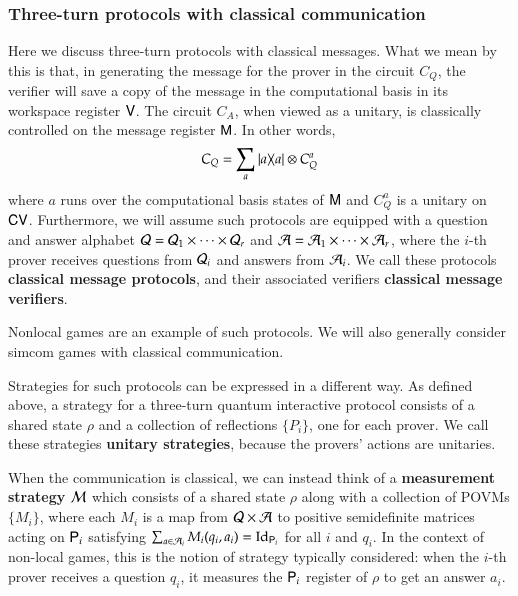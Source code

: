 \subsubsection{Three-turn protocols with classical communication}


Here we discuss three-turn protocols with classical messages. What we mean by this is that, in generating the message for the prover in the circuit $C_Q$, the verifier will save a copy of the message in the computational basis in its workspace register ${\mathsf{V}}$. The circuit $C_A$, when viewed as a unitary, is classically controlled on the message register ${\mathsf{M}}$. In other words, 
\[
	C_Q = \sum_{a} |a\rangle\! \langle a| \otimes C_Q^a 
\]
where $a$ runs over the computational basis states of ${\mathsf{M}}$ and $C_Q^a$ is a unitary on ${\mathsf{C}} {\mathsf{V}}$. Furthermore, we will assume such protocols are equipped with a question and answer alphabet $\mathcal Q = \mathcal Q_1 \times \cdots \times \mathcal Q_r$ and $\mathcal A = \mathcal A_1 \times \cdots \times \mathcal A_r$, where the $i$-th prover receives questions from $\mathcal Q_i$ and answers from $\mathcal A_i$. We call these protocols \textbf{classical message protocols}, and their associated verifiers \textbf{classical message verifiers}.

Nonlocal games are an example of such protocols. We will also generally consider simcom games with classical communication. 

Strategies for such protocols can be expressed in a different way. As defined above, a strategy for a three-turn quantum interactive protocol consists of a shared state $\rho$ and a collection of reflections $\{ P_i \}$, one for each prover. We call these strategies \textbf{unitary strategies}, because the provers' actions are unitaries.

When the communication is classical, we can instead think of a \textbf{measurement strategy} $\mathcal M$ which consists of a shared state $\rho$ along with a collection of POVMs $\{M_i\}$, where each $M_i$ is a map from $\mathcal Q \times \mathcal A$ to positive semidefinite matrices acting on ${\mathsf{P}}_i$ satisfying $\sum_{a \in \mathcal A_i} M_i(q_i,a_i) = \mathop{\mathrm{Id}}\!\mathinner{}_{{\mathsf{P}}_i}$ for all $i$ and $q_i$. In the context of non-local games, this is the notion of strategy typically considered: when the $i$-th prover receives a question $q_i$, it measures the ${\mathsf{P}}_i$ register of $\rho$ to get an answer $a_i$. 

